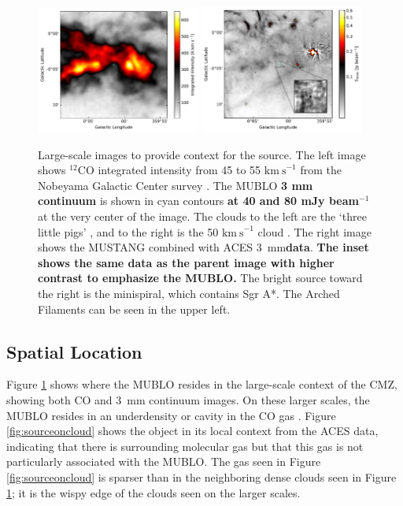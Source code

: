 \documentclass[]{aastex631}
\newcommand{\kms}{\ensuremath{\mathrm{km~s}^{-1}}\xspace}
\newcommand{\threemm}{3~mm\xspace}
\def\rr#1{\textbf{#1}}
\begin{document}
\begin{figure}
    \centering
    \includegraphics[width=0.48\textwidth]{figures/12COContext.pdf}
    \includegraphics[width=0.48\textwidth]{figures/MUSTANG3mmContext.pdf}
    \caption{Large-scale images to provide context for the source.
    The left image shows $^{12}$CO integrated intensity from 45 to 55 \kms from the Nobeyama Galactic Center survey \citep{Tokuyama2019}.
    The MUBLO \rr{3 mm continuum} is shown in cyan contours \rr{at 40 and 80 mJy beam$^{-1}$} at the very center of the image.
    The clouds to the left are the `three little pigs' \citep{Battersby2020}, and to the right is the 50 \kms cloud \citep{Uehara2019}.
    The right image shows the MUSTANG combined with ACES \threemm \rr{data}.
    \rr{The inset shows the same data as the parent image with higher contrast to emphasize the MUBLO.}
    The bright source toward the right is the minispiral, which contains Sgr A*.
    The Arched Filaments can be seen in the upper left.
    }
    \label{fig:bigcontext}
\end{figure}

\subsection{Spatial Location}
\label{sec:spatiallocation}
Figure \ref{fig:bigcontext} shows where the MUBLO resides in the large-scale context of the CMZ, showing both CO and \threemm continuum images.
On these larger scales, the MUBLO resides in an underdensity or cavity in the CO gas \citep{Tokuyama2019}.
Figure \ref{fig:sourceoncloud} shows the object in its local context from the ACES data, indicating that there is surrounding molecular gas but that this gas is not particularly associated with the MUBLO.
The gas seen in Figure \ref{fig:sourceoncloud} is sparser than in the neighboring dense clouds seen in Figure \ref{fig:bigcontext}; it is the wispy edge of the clouds seen on the larger scales.
\end{document}
